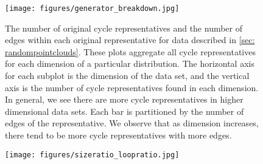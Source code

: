 \newpage 
 \begin{figure}[h!]
\begin{center}
\texttt{[image: figures/generator\_breakdown.jpg]} 
\end{center}
\caption{The number of original cycle representatives and the number of edges within each original representative for data described in \se \ref{sec: randompointclouds}. These plots aggregate all cycle representatives for each dimension of a particular distribution. The horizontal axis for each subplot is the dimension of the data set, and the vertical axis is the number of cycle representatives found in each dimension. In general, we see there are more cycle representatives in higher dimensional data sets. Each bar is partitioned by the number of edges of the representative. We observe that as dimension increases, there tend to be more cycle representatives with more edges. 
}\label{fig:gen_num_breakdown}
\end{figure}

\DIFdelbegin %
\DIFdelend \DIFaddbegin \begin{figure}
    \centering
    \texttt{[image: figures/sizeratio\_loopratio.jpg]}
    \caption{} 
    \label{fig:my_label}
\end{figure}
\DIFaddend 

